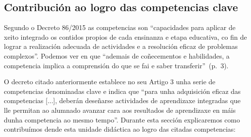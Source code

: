 \subsection{Contribución ao logro das competencias clave}\label{sec:competencias}
Segundo o Decreto 86/2015 as competencias son ``capacidades para aplicar de xeito integrado os contidos propios de cada ensinanza e etapa educativa, co fin de lograr a realización adecuada de actividades e a resolución eficaz de problemas complexos''. Podemos ver en  que ``ademais de coñecementos e habilidades, a competencia implica a comprensión do que se fai e saber transferir''~(p.~3).

O decreto citado anteriormente establece no seu Artigo 3 unha serie de competencias denominadas clave e indica que ``para unha adquisición eficaz das competencias [...], deberán deseñarse actividades de aprendizaxe integradas que lle permitan ao alumnado avanzar cara aos resultados de aprendizaxe en máis dunha competencia ao mesmo tempo''. Durante esta sección explicaremos como contribuímos dende esta unidade didáctica ao logro das citadas competencias:

